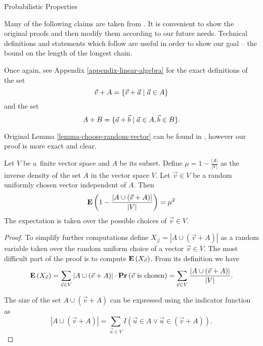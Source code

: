 \begin{section}{Probabilistic Properties}
\label{section-probabilistic-properties}

Many of the following claims are taken from \cite{DBLP:journals/jacm/AlonDMPT99}. It is convenient to show the original proofs and then modify them according to our future needs. Technical definitions and statements which follow are useful in order to show our goal -- the bound on the length of the longest chain.

Once again, see Appendix \ref{appendix-linear-algebra} for the exact definitions of the set \[ \vec{v} + A = \{ \vec{v} + \vec{a} \mid \vec{a} \in A \} \] and the set \[ A + B = \{ \vec{a} + \vec{b} \mid \vec{a} \in A, \vec{b} \in B \} \text{.} \]

Original Lemma \ref{lemma-choose-random-vector} can be found in \cite{DBLP:books/sp/Mehlhorn84}, however our proof is more exact and clear.

\begin{lemma}
\label{lemma-choose-random-vector}
Let $V$ be a~finite vector space and $A$ be its subset. Define $\mu = 1 - \frac{|A|}{|V|}$ as the inverse density of the set $A$ in the vector space $V$. Let $\vec{v} \in V$ be a random uniformly chosen vector independent of $A$. Then
\begin{displaymath}
\mathbf{E}\left(1 - \frac{|A \cup (\vec{v} + A)|}{|V|}\right) = \mu^2
\end{displaymath}
The expectation is taken over the possible choices of $\vec{v} \in V$.

\begin{proof}
To simplify further computations define $X_{\vec{v}} = |A \cup (\vec{v} + A)|$ as a random variable taken over the random uniform choice of a vector $\vec{v} \in V$. The most difficult part of the proof is to compute $\mathbf{E}\left(X_{\vec{v}}\right)$. From its definition we have
\[
\mathbf{E}\left(X_{\vec{v}}\right) = \displaystyle\sum_{\vec{v} \in V} |A \cup (\vec{v} + A)| \cdot \mathbf{Pr}\left(\vec{v} \text{ is chosen}\right) = \displaystyle\sum_{\vec{v} \in V} \frac{|A \cup (\vec{v} + A)|}{|V|} \text{.}
\]

The size of the set $A \cup (\vec{v} + A)$ can be expressed using the indicator function as
\[
|A \cup (\vec{v} + A)| = \displaystyle\sum_{\vec{u} \in V} I(\vec{u} \in A \vee \vec{u} \in (\vec{v} + A)) \text{.}
\]


\end{proof}
\end{lemma}
\end{section}
